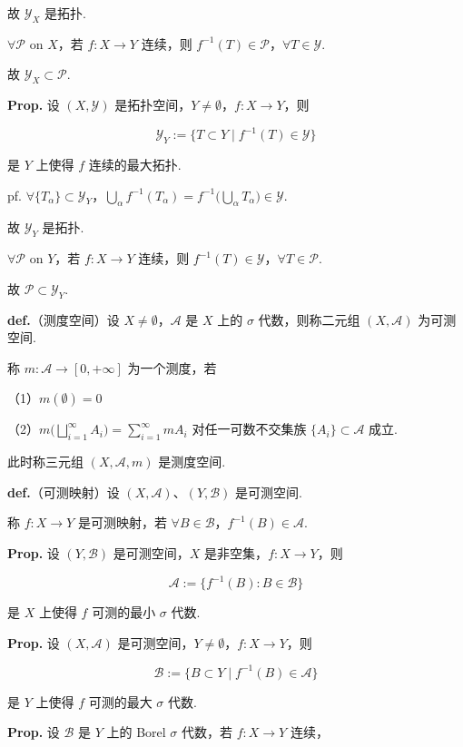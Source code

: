 \documentclass[11pt]{ctexart}
\theoremstyle{definition}
\begin{document}
故 $\mathcal{Y}_X$ 是拓扑.

$\forall \mathcal{P}$ on $X$，若 $f: X \to Y$ 连续，则 $f^{-1}(T) \in \mathcal{P}$，$\forall T \in \mathcal{Y}$.

故 $\mathcal{Y}_X \subset \mathcal{P}$.

\textbf{Prop.} 设 $(X, \mathcal{Y})$ 是拓扑空间，$Y \neq \emptyset$，$f: X \to Y$，则

\[
\mathcal{Y}_Y := \{T \subset Y \mid f^{-1}(T) \in \mathcal{Y}\}
\]

是 $Y$ 上使得 $f$ 连续的最大拓扑.

pf. $\forall \{T_\alpha\} \subset \mathcal{Y}_Y$，$\bigcup_\alpha f^{-1}(T_\alpha) = f^{-1}\big(\bigcup_\alpha T_\alpha\big) \in \mathcal{Y}$.

故 $\mathcal{Y}_Y$ 是拓扑.

$\forall \mathcal{P}$ on $Y$，若 $f: X \to Y$ 连续，则 $f^{-1}(T) \in \mathcal{Y}$，$\forall T \in \mathcal{P}$.

故 $\mathcal{P} \subset \mathcal{Y}_Y$.

\textbf{def.}（测度空间）设 $X \neq \emptyset$，$\mathscr{A}$ 是 $X$ 上的 $\sigma$ 代数，则称二元组 $(X, \mathscr{A})$ 为可测空间.

称 $m: \mathscr{A} \to [0, +\infty]$ 为一个测度，若

（1）$m(\emptyset) = 0$

（2）$m\Big(\bigsqcup\limits_{i=1}^{\infty} A_i\Big) = \sum\limits_{i=1}^{\infty} mA_i$ 对任一可数不交集族 $\{A_i\} \subset \mathscr{A}$ 成立.

此时称三元组 $(X, \mathscr{A}, m)$ 是测度空间.

\textbf{def.}（可测映射）设 $(X, \mathscr{A})$、$(Y, \mathcal{B})$ 是可测空间.

称 $f: X \to Y$ 是可测映射，若 $\forall B \in \mathcal{B}$，$f^{-1}(B) \in \mathscr{A}$.

\textbf{Prop.} 设 $(Y, \mathcal{B})$ 是可测空间，$X$ 是非空集，$f: X \to Y$，则

\[
\mathscr{A} := \{f^{-1}(B) : B \in \mathcal{B}\}
\]

是 $X$ 上使得 $f$ 可测的最小 $\sigma$ 代数.

\textbf{Prop.} 设 $(X, \mathscr{A})$ 是可测空间，$Y \neq \emptyset$，$f: X \to Y$，则

\[
\mathcal{B} := \{B \subset Y \mid f^{-1}(B) \in \mathscr{A}\}
\]

是 $Y$ 上使得 $f$ 可测的最大 $\sigma$ 代数.

\textbf{Prop.} 设 $\mathcal{B}$ 是 $Y$ 上的 Borel $\sigma$ 代数，若 $f: X \to Y$ 连续，
\end{document}
